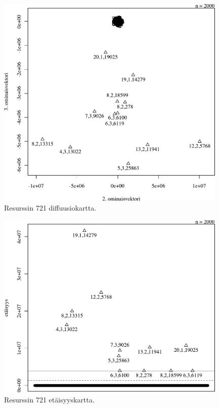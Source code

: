 \begin{figure}[p]
\centering
\includegraphics[width=11cm]{pics/diffuusiokuvat/service_721.pdf}
\caption{Resurssin 721 diffuusiokartta.}
\label{diffusio_721}
\end{figure}

\begin{figure}[p]
\centering
\includegraphics[width=11cm]{pics/tiheyskuvat/service_721.pdf}
\caption{Resurssin 721 etäisyyskartta.}
\label{service_721}
\end{figure}

